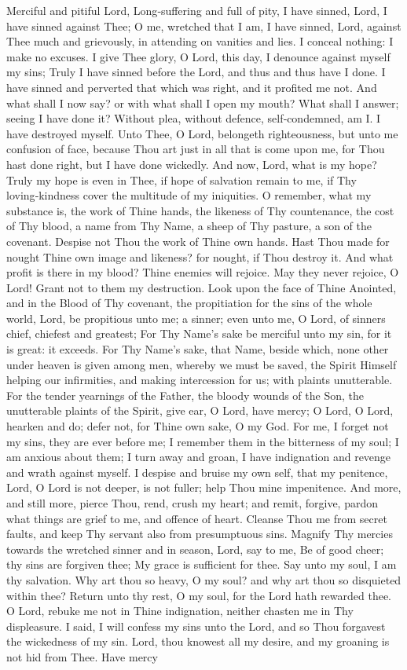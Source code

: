 Merciful and pitiful Lord, Long‑suffering and full of pity, I have sinned, Lord, I have sinned against Thee; O me, wretched that I am, I have sinned, Lord, against Thee much and grievously, in attending on vanities and lies. I conceal nothing: I make no excuses. I give Thee glory, O Lord, this day, I denounce against myself my sins; Truly I have sinned before the Lord, and thus and thus have I done. I have sinned and perverted that which was right, and it profited me not. And what shall I now say? or with what shall I open my mouth? What shall I answer;  seeing I have done it? Without plea, without defence, self‑condemned, am I.  I have destroyed myself. Unto Thee, O Lord, belongeth righteousness, but unto me confusion of face, because Thou art just in all that is come upon me, for Thou hast done right, but I have done wickedly. And now, Lord, what is my hope? Truly my hope is even in Thee, if hope of salvation remain to me, if Thy loving‑kindness cover the multitude of my iniquities. O remember, what my substance is, the work of Thine hands, the likeness of Thy countenance, the cost of Thy blood, a name from Thy Name, a sheep of Thy pasture, a son of the covenant. Despise not Thou the work of Thine own hands. Hast Thou made for nought Thine own image and likeness? for nought, if Thou destroy it. And what profit is there in my blood? Thine enemies will rejoice. May they never rejoice, O Lord! Grant not to them my destruction. Look upon the face of Thine Anointed, and in the Blood of Thy covenant, the propitiation for the sins of the whole world, Lord, be propitious unto me; a sinner; even unto me, O Lord, of sinners chief, chiefest and greatest; For Thy Name’s sake be merciful unto my sin, for it is great: it exceeds. For Thy Name’s sake, that Name, beside which, none other under heaven is given among men, whereby we must be saved, the Spirit Himself helping our infirmities, and making intercession for us; with plaints unutterable. For the tender yearnings of the Father, the bloody wounds of the Son, the unutterable plaints of the Spirit, give ear, O Lord, have mercy; O Lord, O Lord, hearken and do; defer not, for Thine own sake, O my God. For me, I forget not my sins, they are ever before me; I remember them in the bitterness of my soul; I am anxious about them; I turn away and groan, I have indignation and revenge and wrath against myself. I despise and bruise my own self, that my penitence, Lord, O Lord is not deeper, is not fuller; help Thou mine impenitence. And more, and still more, pierce Thou, rend, crush my heart; and remit, forgive, pardon what things are grief to me, and offence of heart. Cleanse Thou me from secret faults, and keep Thy servant also from presumptuous sins. Magnify Thy mercies towards the wretched sinner and in season, Lord, say to me, Be of good cheer; thy sins are forgiven thee; My grace is sufficient for thee. Say unto my soul, I am thy salvation. Why art thou so heavy, O my soul? and why art thou so disquieted within thee? Return unto thy rest, O my soul, for the Lord hath rewarded thee. O Lord, rebuke me not in Thine indignation,  neither chasten me in Thy displeasure. I said, I will confess my sins unto the Lord, and so Thou forgavest the wickedness of my sin. Lord, thou knowest all my desire, and my groaning is not hid from  Thee. Have mercy 